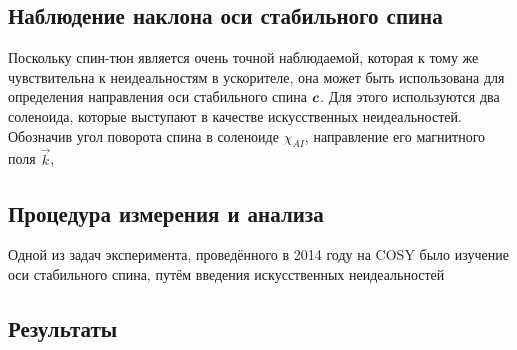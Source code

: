 \subsection{Наблюдение наклона оси стабильного спина}
Поскольку спин-тюн является очень точной наблюдаемой, которая к тому же чувствительна к неидеальностям
в ускорителе, она может быть использована для определения направления оси стабильного спина $\boldsymbol c$.
Для этого используются два соленоида, которые выступают в качестве искусственных неидеальностей. Обозначив
угол поворота спина в соленоиде $\chi_{AI}$, направление его магнитного поля $\vec k$,


\subsection{Процедура измерения и анализа}
Одной из задач эксперимента, проведённого в 2014 году на COSY было изучение оси стабильного спина, путём
введения искусственных неидеальностей


\subsection{Результаты}
